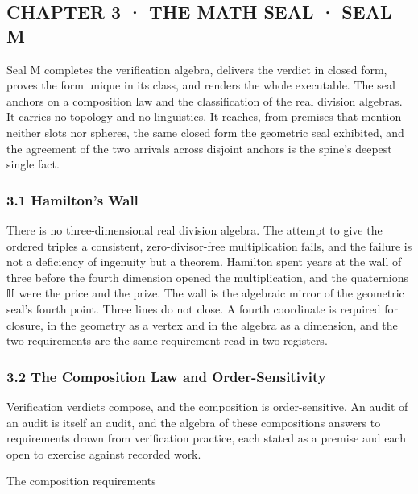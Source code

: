 \documentclass[10pt,twocolumn]{article}
\begin{document}
\hypertarget{chapter-3-the-math-seal-seal-m}{%
\subsection{CHAPTER 3 · THE MATH SEAL · SEAL
M}\label{chapter-3-the-math-seal-seal-m}}

Seal M completes the verification algebra, delivers the verdict in
closed form, proves the form unique in its class, and renders the whole
executable. The seal anchors on a composition law and the classification
of the real division algebras. It carries no topology and no
linguistics. It reaches, from premises that mention neither slots nor
spheres, the same closed form the geometric seal exhibited, and the
agreement of the two arrivals across disjoint anchors is the spine's
deepest single fact.

\hypertarget{hamiltons-wall}{%
\subsubsection{3.1 Hamilton's Wall}\label{hamiltons-wall}}

There is no three-dimensional real division algebra. The attempt to give
the ordered triples a consistent, zero-divisor-free multiplication
fails, and the failure is not a deficiency of ingenuity but a theorem.
Hamilton spent years at the wall of three before the fourth dimension
opened the multiplication, and the quaternions ℍ were the price and the
prize. The wall is the algebraic mirror of the geometric seal's fourth
point. Three lines do not close. A fourth coordinate is required for
closure, in the geometry as a vertex and in the algebra as a dimension,
and the two requirements are the same requirement read in two registers.

\hypertarget{the-composition-law-and-order-sensitivity}{%
\subsubsection{3.2 The Composition Law and
Order-Sensitivity}\label{the-composition-law-and-order-sensitivity}}

Verification verdicts compose, and the composition is order-sensitive.
An audit of an audit is itself an audit, and the algebra of these
compositions answers to requirements drawn from verification practice,
each stated as a premise and each open to exercise against recorded
work.

\begin{jbox}{The composition requirements}

\end{jbox}
\end{document}
